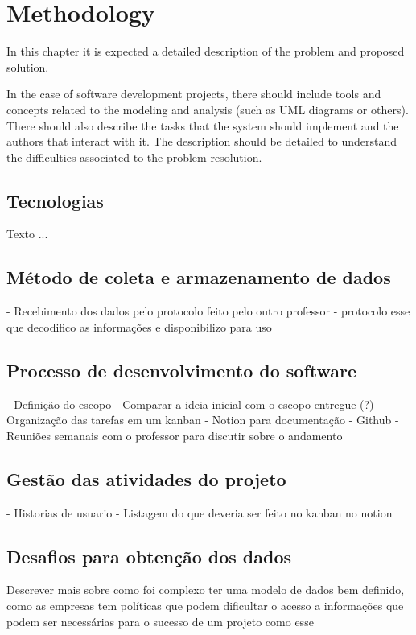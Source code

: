 \chapter{Methodology}\label{cap:metodology}

In this chapter it is expected a detailed description of the problem and proposed solution.

In the case of software development projects, there should include tools and concepts related to the modeling and analysis (such as UML diagrams or others). There should also describe the tasks that the system should implement and the authors that interact with it. The description should be detailed to understand the difficulties associated to the problem resolution.

\section[Tecnologias]{Tecnologias}
Texto ...

\section[Método de coleta e armazenamento de dados]{Método de coleta e armazenamento de dados}
- Recebimento dos dados pelo protocolo feito pelo outro professor
- protocolo esse que decodifico as informações e disponibilizo para uso

\section[Processo de desenvolvimento do software]{Processo de desenvolvimento do software}

- Definição do escopo - Comparar a ideia inicial com o escopo entregue (?)
- Organização das tarefas em um kanban
- Notion para documentação
- Github
- Reuniões semanais com o professor para discutir sobre o andamento


\section[Gestão das atividades do projeto]{Gestão das atividades do projeto}
- Historias de usuario
- Listagem do que deveria ser feito no kanban no notion

\section[Desafios para obtenção dos dados]{Desafios para obtenção dos dados}
Descrever mais sobre como foi complexo ter uma modelo de dados bem definido, como as empresas tem políticas que podem dificultar o acesso a informações que podem ser necessárias para o sucesso de um projeto como esse
